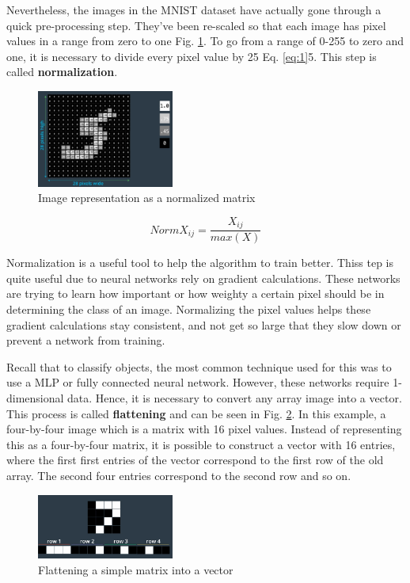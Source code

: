 \documentclass{article}
\begin{document}
Nevertheless, the images in the MNIST dataset have actually gone through a quick pre-processing step. They've been re-scaled so that each image has pixel values in a range from zero to one Fig. \ref{fig:f3}. To go from a range of 0-255 to zero and one, it is necessary to divide every pixel value by 25 Eq. \eqref{eq:1}5. This step is called \textbf{normalization}.

\begin{figure}[ht]
    \centering
    \includegraphics[width=0.4\textwidth,height=0.4\textheight,keepaspectratio]{images/image_norm.png}
    \captionsetup{justification=centering}
    \caption{Image representation as a normalized matrix}
    \label{fig:f3}
\end{figure}

\begin{equation}
NormX_{ij} = \frac{X_{ij}}{max(X)} \label{eq:1}
\end{equation}

Normalization is a useful tool to help the algorithm to train better. Thiss tep is quite useful due to neural networks rely on gradient calculations. These networks are trying to learn how important or how weighty a certain pixel should be in determining the class of an image. Normalizing the pixel values helps these gradient calculations stay consistent, and not get so large that they slow down or prevent a network from training.

Recall that to classify objects, the most common technique used for this was to use a MLP or fully connected neural network. However, these networks require 1-dimensional data. Hence, it is necessary to convert any array image into a vector. This process is called \textbf{flattening} and can be seen in Fig. \ref{fig:f4}. In this example, a four-by-four image which is a matrix with 16 pixel values. Instead of representing this as a four-by-four matrix, it is possible to construct a vector with 16 entries, where the first first entries of the vector correspond to the first row of the old array. The second four entries correspond to the second row and so on.

\begin{figure}[ht]
    \centering
    \includegraphics[width=0.4\textwidth,height=0.4\textheight,keepaspectratio]{images/flattening.png}
    \captionsetup{justification=centering}
    \caption{Flattening a simple matrix into a vector}
    \label{fig:f4}
\end{figure}
\end{document}
